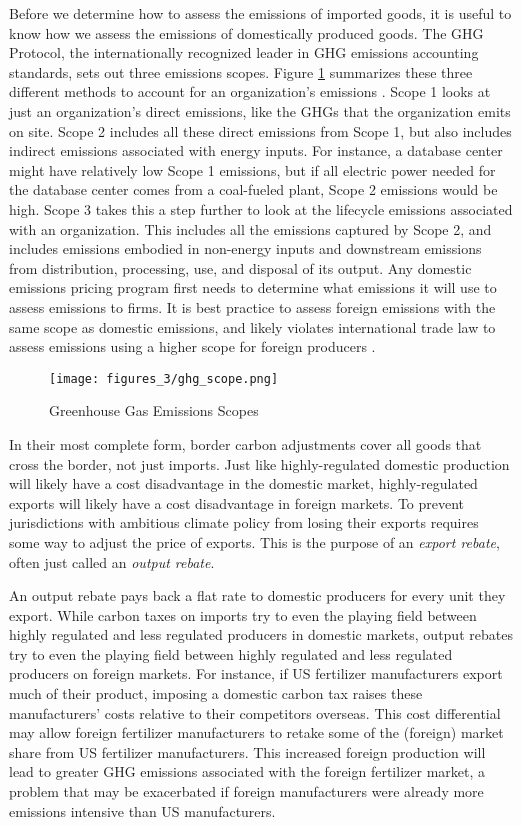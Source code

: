 Before we determine how to assess the emissions of imported goods, it is useful to know how we assess the emissions of domestically produced goods. The GHG Protocol, the internationally recognized leader in GHG emissions accounting standards, sets out three emissions scopes. Figure \ref{scopes} summarizes these three different methods to account for an organization’s emissions \citep{ghg_protocol_2011}. Scope 1 looks at just an organization’s direct emissions, like the GHGs that the organization emits on site. Scope 2 includes all these direct emissions from Scope 1, but also includes indirect emissions associated with energy inputs. For instance, a database center might have relatively low Scope 1 emissions, but if all electric power needed for the database center comes from a coal-fueled plant, Scope 2 emissions would be high. Scope 3 takes this a step further to look at the lifecycle emissions associated with an organization. This includes all the emissions captured by Scope 2, and includes emissions embodied in non-energy inputs and downstream emissions from distribution, processing, use, and disposal of its output. Any domestic emissions pricing program first needs to determine what emissions it will use to assess emissions to firms. It is best practice to assess foreign emissions with the same scope as domestic emissions, and likely violates international trade law to assess emissions using a higher scope for foreign producers \citep{cosbey2020developing}.

\begin{figure}
	\caption{Greenhouse Gas Emissions Scopes \citep{ghg_protocol_2011}\label{scopes}}
	\centering
	\texttt{[image: figures\_3/ghg\_scope.png]}
\end{figure}

In their most complete form, border carbon adjustments cover all goods that cross the border, not just imports. Just like highly-regulated domestic production will likely have a cost disadvantage in the domestic market, highly-regulated exports will likely have a cost disadvantage in foreign markets. To prevent jurisdictions with ambitious climate policy from losing their exports requires some way to adjust the price of exports. This is the purpose of an \emph{export rebate}, often just called an \emph{output rebate}.

An output rebate pays back a flat rate to domestic producers for every unit they export. While carbon taxes on imports try to even the playing field between highly regulated and less regulated producers in domestic markets, output rebates try to even the playing field between highly regulated and less regulated producers on foreign markets. For instance, if US fertilizer manufacturers export much of their product, imposing a domestic carbon tax raises these manufacturers’ costs relative to their competitors overseas. This cost differential may allow foreign fertilizer manufacturers to retake some of the (foreign) market share from US fertilizer manufacturers. This increased foreign production will lead to greater GHG emissions associated with the foreign fertilizer market, a problem that may be exacerbated if foreign manufacturers were already more emissions intensive than US manufacturers.

